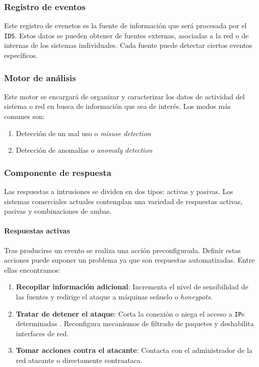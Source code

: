 \documentclass[12pt]{article}
\begin{document}
            \subsubsection{Registro de eventos}
                Este registro de evenetos es la fuente de información que será procesada por el \texttt{IDS}. Estos datos se pueden obtener de fuentes externas, asociadas a la red o de internas de los sistemas individuales. Cada fuente puede detectar ciertos eventos específicos.

            \subsubsection{Motor de análisis}
                Este motor se encargará de organizar y caracterizar los datos de actividad del sistema o red en busca de información que sea de interés. Los modos más comunes son:

                \begin{enumerate}
                    \item Detección de un mal uso o \textit{misuse detection}
                    \item Detección de anomalías o \textit{anomaly detection}
                \end{enumerate}

            \subsubsection{Componente de respuesta}
                Las respuestas a intrusiones se dividen en dos tipos: activas y pasivas. Los sistemas comerciales actuales contemplan una variedad de respuestas activas, pasivas y combinaciones de ambas.

                \paragraph{Respuestas activas}
                    Tras producirse un evento se realiza una acción preconfigurada. Definir estas acciones puede suponer un problema ya que son respuestas automatizadas. Entre ellas encontramos:

                    \begin{enumerate}
                        \item \textbf{Recopilar información adicional}: Incrementa el nivel de sensibilidad de las fuentes y redirige el ataque a máquinas señuelo o \textit{honeypots}.
                        \item \textbf{Tratar de detener el ataque}: Corta la conexión o niega el acceso a \texttt{IP}s determinadas . Reconfigura mecanismos de filtrado de paquetes y deshabilita interfaces de red.
                        \item \textbf{Tomar acciones contra el atacante}: Contacta con el administrador de la red atacante o directamente contraataca.
                    \end{enumerate}
\end{document}
